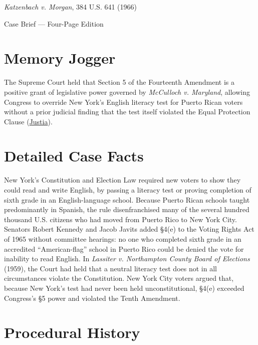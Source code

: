\documentclass[12pt]{article}
\begin{document}
\begin{center}
{\LARGE \textit{Katzenbach v. Morgan}, 384 U.S. 641 (1966)\par}
\vspace{0.8em}
{\large Case Brief --- Four-Page Edition\par}
\end{center}
\vspace{1em}

\section{Memory Jogger}

The Supreme Court held that Section 5 of the Fourteenth Amendment is a positive grant of legislative power governed by \textit{McCulloch v. Maryland}, allowing Congress to override New York's English literacy test for Puerto Rican voters without a prior judicial finding that the test itself violated the Equal Protection Clause (\href{https://supreme.justia.com/cases/federal/us/384/641/}{Justia}).

\section{Detailed Case Facts}

New York's Constitution and Election Law required new voters to show they could read and write English, by passing a literacy test or proving completion of sixth grade in an English-language school. Because Puerto Rican schools taught predominantly in Spanish, the rule disenfranchised many of the several hundred thousand U.S. citizens who had moved from Puerto Rico to New York City. Senators Robert Kennedy and Jacob Javits added \S 4(e) to the Voting Rights Act of 1965 without committee hearings: no one who completed sixth grade in an accredited ``American-flag'' school in Puerto Rico could be denied the vote for inability to read English. In \textit{Lassiter v. Northampton County Board of Elections} (1959), the Court had held that a neutral literacy test does not in all circumstances violate the Constitution. New York City voters argued that, because New York's test had never been held unconstitutional, \S 4(e) exceeded Congress's \S 5 power and violated the Tenth Amendment.

\section{Procedural History}
\end{document}
